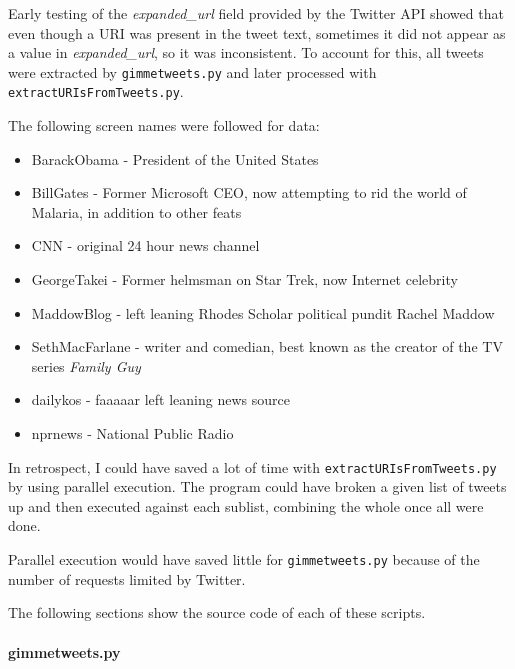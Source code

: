 \documentclass[letterpaper,11pt]{article}
\begin{document}
Early testing of the \emph{expanded\_url} field provided by the Twitter API showed that even though a URI was present in the tweet text, sometimes it did not appear as a value in \emph{expanded\_url}, so it was inconsistent.  To account for this, all tweets were extracted by \verb+gimmetweets.py+ and later processed with \verb+extractURIsFromTweets.py+.

The following screen names were followed for data:
\begin{itemize}
\item BarackObama -  President of the United States
\item BillGates - Former Microsoft CEO, now attempting to rid the world of Malaria, in addition to other feats
\item CNN - original 24 hour news channel
\item GeorgeTakei - Former helmsman on Star Trek, now Internet celebrity
\item MaddowBlog - left leaning Rhodes Scholar political pundit Rachel Maddow
\item SethMacFarlane - writer and comedian, best known as the creator of the TV series \emph{Family Guy}
\item dailykos - faaaaar left leaning news source
\item nprnews - National Public Radio
\end{itemize}

In retrospect, I could have saved a lot of time with \verb+extractURIsFromTweets.py+ by using parallel execution.  The program could have broken a given list of tweets up and then executed against each sublist, combining the whole once all were done.

Parallel execution would have saved little for \verb+gimmetweets.py+ because of the number of requests limited by Twitter.

The following sections show the source code of each of these scripts.

\newpage
\paragraph{gimmetweets.py}\mbox{} \\


\end{document}

